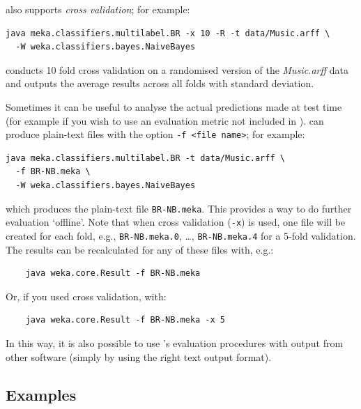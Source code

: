 \documentclass[11pt]{article}
\newcommand{\MEKA}{Meka}
\begin{document}

\framework{\MEKA} also supports \emph{cross validation}; for example:
\begin{lstlisting}
java meka.classifiers.multilabel.BR -x 10 -R -t data/Music.arff \
  -W weka.classifiers.bayes.NaiveBayes
\end{lstlisting}
conducts 10 fold cross validation on a randomised version of the \textit{Music.arff} data and outputs the average results across all folds with standard deviation. %

Sometimes it can be useful to analyse the actual predictions made at test time (for example if you wish to use an evaluation metric not included in \framework{\MEKA}). \framework{\MEKA} can produce plain-text files with the option \texttt{-f <file name>}; for example:
\begin{lstlisting}
java meka.classifiers.multilabel.BR -t data/Music.arff \ 
  -f BR-NB.meka \
  -W weka.classifiers.bayes.NaiveBayes
\end{lstlisting}
which produces the plain-text file \texttt{BR-NB.meka}. This provides a way to do further evaluation `offline'. Note that when cross validation (\texttt{-x}) is used, one file will be created for each fold, e.g., \texttt{BR-NB.meka.0}, \ldots, \texttt{BR-NB.meka.4} for a 5-fold validation. The results can be recalculated for any of these files with, e.g.:
\begin{lstlisting}
	java weka.core.Result -f BR-NB.meka
\end{lstlisting}
Or, if you used cross validation, with:
\begin{lstlisting}
	java weka.core.Result -f BR-NB.meka -x 5
\end{lstlisting}
In this way, it is also possible to use \framework{\MEKA}'s evaluation procedures with output from other software (simply by using the right text output format).

\subsection{Examples} 
\end{document}
